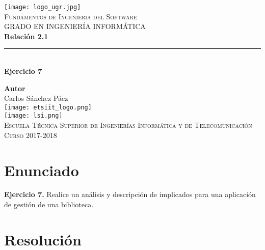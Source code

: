 \documentclass[12pt,spanish]{article}
\begin{document}
\begin{titlepage}

\newlength{\centeroffset}
\setlength{\centeroffset}{-0.5\oddsidemargin}
\addtolength{\centeroffset}{0.5\evensidemargin}
\thispagestyle{empty}

\noindent\hspace*{\centeroffset}\begin{minipage}{\textwidth}

\centering
\texttt{[image: logo\_ugr.jpg]}\\[1.4cm]

\textsc{ \Large Fundamentos de Ingeniería del Software\\[0.2cm]}
\textsc{GRADO EN INGENIERÍA INFORMÁTICA}\\[1cm]

{\Huge\bfseries Relación 2.1\\
}
\noindent\rule[-1ex]{\textwidth}{3pt}\\[3.5ex]
{\large\bfseries Ejercicio 7}
\end{minipage}

\vspace{2.5cm}
\noindent\hspace*{\centeroffset}
\begin{minipage}{\textwidth}
\centering

\textbf{Autor}\\ {Carlos Sánchez Páez}\\[2.5ex]
\texttt{[image: etsiit\_logo.png]}\\[0.1cm]
\vspace{1.5cm}
\texttt{[image: lsi.png]}\\[0.1cm]
\vspace{1cm}
\textsc{Escuela Técnica Superior de Ingenierías Informática y de Telecomunicación}\\
\vspace{1cm}
\textsc{Curso 2017-2018}
\end{minipage}
\end{titlepage}
\tableofcontents
\listoftables
\newpage
\section{Enunciado}
{\large\textbf{Ejercicio 7.} Realice un análisis y descripción de implicados para una aplicación de gestión de una biblioteca.}
\section{Resolución}
\end{document}
